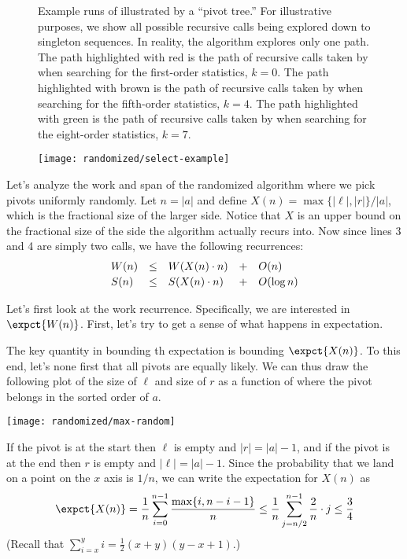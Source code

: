{\begin{figure}
\begin{example}
\label{ex:randomized::select}
Example runs of \ksmall{} illustrated by a ``pivot tree.''  For
illustrative purposes, we show all possible recursive calls being
explored down to singleton sequences.
%
In reality, the algorithm explores only one path. 
%
The path highlighted with red is the path of recursive calls taken by
\ksmall when searching for the first-order statistics, $k = 0$.
%
The path highlighted with brown is the path of recursive calls taken by
\ksmall when searching for the fifth-order statistics, $k = 4$.
%
The path highlighted with green is the path of recursive calls taken by
\ksmall when searching for the eight-order statistics, $k = 7$.

\begin{center}
\texttt{[image: randomized/select-example]}
\end{center}
\end{example}
\end{figure}


Let's analyze the work and span of the randomized algorithm where we
pick pivots uniformly randomly.  
%
Let $n = |a|$ and define
$X(n)= \max\{|\ell|, |r|\}/|a|$, which
is the fractional size of the larger side.  Notice that $X$ is an
upper bound on the fractional size of the side the algorithm actually
recurs into.  Now since lines 3 and 4 are simply two 
calls, we have the following recurrences:
\begin{align*}
  \begin{array}{l c l c l}
    W(n) &\leq&  W(X(n) \cdot n) &+& O(n)\\[0.2em]
    S(n) &\leq&  S(X(n) \cdot n) &+& O(\log n)\\
  \end{array}
\end{align*}

Let's first look at the work recurrence. Specifically, we are
interested in $\expct{W(n)}$.  First, let's try to get a sense of what
happens in expectation.

The key quantity in bounding th expectation is bounding  $\expct{X(n)}$. 
%
To this end, let's none first that all pivots are equally likely.
%
We can thus draw the following plot of the size of $\ell$ and size of
$r$ as a function of where the pivot belongs in the sorted order of
$a$.
\begin{center}
  \texttt{[image: randomized/max-random]}
\end{center}
%
If the pivot is at the start then $\ell$ is empty and $|r| =|a|-1$,
and if the pivot is at the end then $r$ is empty and $|\ell|=|a|-1$.
%
Since the probability that we land on a point on the $x$ axis is
$1/n$, we can write the expectation for $X(n)$ as
\begin{align*}
  \expct{X(n)} = \frac{1}{n} \sum_{i=0}^{n-1} \frac{\max\{i, n-i-1\}}{n} \leq \frac{1}{n} \sum_{j=n/2}^{n-1} \frac{2}{n}\cdot j \leq \frac{3}{4}
\end{align*}
(Recall that $\sum_{i=x}^y i = \frac12(x+y)(y - x + 1)$.)

}
